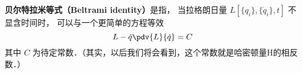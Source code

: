 
\begin{issues}
\issueDraft
\end{issues}


\textbf{贝尔特拉米等式（Beltrami identity）}是指， 当拉格朗日量 $L[\{q_i\}, \{\dot q_i\}, t]$ 不显含时间时， 可以与一个更简单的方程等效
\begin{equation}
L - \dot q \pdv{L}{\dot q} = C
\end{equation}
其中 $C$ 为待定常数．（其实，以后我们将会看到，这个常数就是哈密顿量H的相反数．）